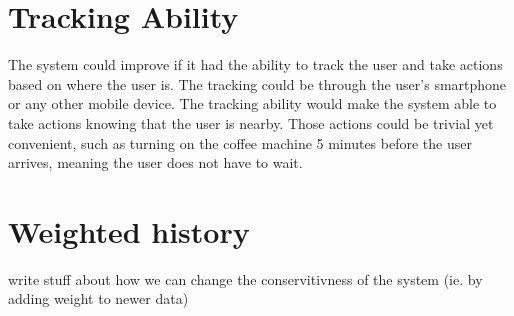 \section{Tracking Ability}
The system could improve if it had the ability to track the user and take actions based on where the user is. The tracking could be through the user's smartphone or any other mobile device. The tracking ability would make the system able to take actions knowing that the user is nearby. Those actions could be trivial yet convenient, such as turning on the coffee machine 5 minutes before the user arrives, meaning the user does not have to wait.

\section{Weighted history}
write stuff about how we can change the conservitivness of the system (ie. by adding weight to newer data)